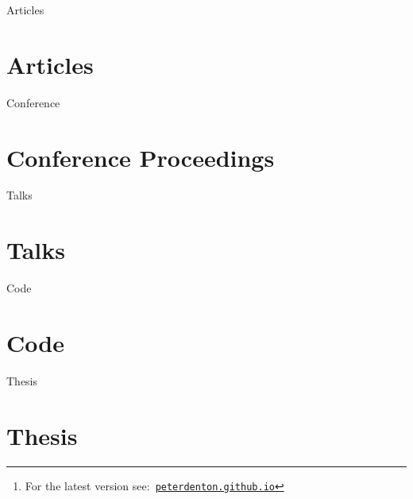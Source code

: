 \documentclass[a4paper,12pt]{article}
\title{\myTitle}
\author{\myName}
\date{\small Updated: \today\footnote{For the latest version see:\ \href{http://peterdenton.github.io}{\tt peterdenton.github.io}}}
\newcommand\myBib[2]{
\begin{btSect}{#2}
\section*{#1}
\btPrintAll
\end{btSect}}
\begin{document}
\makeatletter
\let\@fnsymbol\@arabic
\makeatother

\maketitle



\myBib{Articles}{Articles}
\myBib{Conference Proceedings}{Conference}
\myBib{Talks}{Talks}
\myBib{Code}{Code}
\myBib{Thesis}{Thesis}
\end{document}
